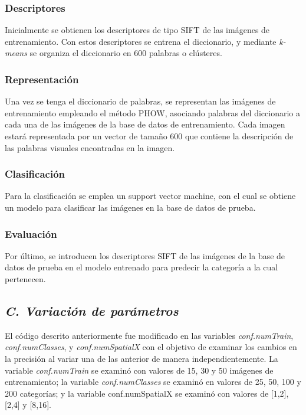 \documentclass[10pt,twocolumn,letterpaper]{article}
\begin{document}
\subsubsection*{Descriptores}
Inicialmente se obtienen los descriptores de tipo SIFT de las imágenes de entrenamiento. Con estos descriptores se entrena el diccionario, y mediante \textit{k-means} se organiza el diccionario en 600 palabras o clústeres.

\subsubsection*{Representación}
Una vez se tenga el diccionario de palabras, se representan las imágenes de entrenamiento empleando el método PHOW, asociando palabras del diccionario a cada una de las imágenes de la base de datos de entrenamiento. Cada imagen estará representada por un vector de tamaño 600 que contiene la descripción de las palabras visuales encontradas en la imagen.

\subsubsection*{Clasificación}
Para la clasificación se emplea un support vector machine, con el cual se obtiene un modelo para clasificar las imágenes en la base de datos de prueba. 
\subsubsection*{Evaluación}
Por último, se introducen los descriptores SIFT de las imágenes de la base de datos de prueba en el modelo entrenado para predecir la categoría a la cual pertenecen.

\subsection{ \textit{C. Variación de parámetros}}
El código descrito anteriormente fue modificado en las variables \textit{conf.numTrain}, \textit{conf.numClasses}, y \textit{conf.numSpatialX} con el objetivo de examinar los cambios en la precisión al variar una de las anterior de manera independientemente. La variable \textit{conf.numTrain} se examinó con valores de 15, 30 y 50 imágenes de entrenamiento; la variable \textit{conf.numClasses} se examinó en valores de 25, 50, 100 y 200 categorías; y la variable {conf.numSpatialX} se examinó con valores de [1,2], [2,4] y [8,16].
\end{document}
